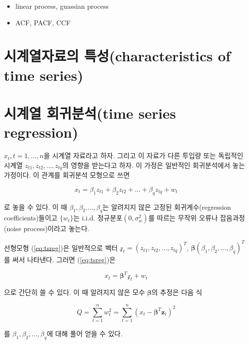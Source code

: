 \documentclass[b5paper,]{scrbook}
\theoremstyle{plain}
\theoremstyle{definition}
\numberwithin{equation}{section}
\begin{document}
\begin{itemize}
\item
  linear process, guassian process
\item
  ACF, PACF, CCF
\end{itemize}

\section{시계열자료의 특성(characteristics of time
series)}\label{-characteristics-of-time-series}

\section{시계열 회귀분석(time series
regression)}\label{-time-series-regression}

\(x_{t},t=1,\ldots ,n\)을 시계열 자료라고 하자. 그리고 이 자료가 다른
투입량 또는 독립적인 시계열 \(z_{t1}, z_{t2}, \ldots ,z_{tq}\)의 영향을
받는다고 하자. 이 가정은 일반적인 회귀분석에서 놓는 가정이다. 이 관계를
회귀분석 모형으로 쓰면

\begin{equation}\label{eq:tsreg}
x_{t}=\beta_{1}z_{t1}+\beta_{2}z_{t2}+\ldots + \beta_{q}z_{tq}+w_{t}
\end{equation}

로 놓을 수 있다. 이 때 \(\beta_{1},\beta_{2}.\ldots , \beta_{q}\)는
알려지지 않은 고정된 회귀계수(regression coefficients)들이고
\(\{ w_{t}\}\)는 i.i.d. 정규분포\((0,\sigma_{w}^{2})\)를 따르는 무작위
오류나 잡음과정(noise process)이라고 놓는다.

선형모형 (\eqref{eq:tsreg})은 일반적으로 벡터
\(\mathcal{z}_{t}=(z_{t1},z_{t2},\ldots , z_{tq})^{T}\),
\(\boldsymbol{\beta}(\beta_{1},\beta_{2},\ldots ,\beta_{q})^{T}\)를 써서
나타낸다. 그러면 (\eqref{eq:tsreg})은

\begin{equation}\label{eq:tsregvec}
x_{t}=\boldsymbol{\beta}^{T}\mathcal{z}_{t}+w_{t}
\end{equation}

으로 간단히 쓸 수 있다. 이 때 알려지지 않은 모수
\(\boldsymbol{\beta}\)의 추정은 다음 식

\begin{equation}\label{eq:tsss}
Q=\sum_{t=1}^{n}w_{t}^{2}=\sum_{t=1}^{n}(x_{t}-\boldsymbol{\beta}^{T}\mathbf{z}_{t})^{2}
\end{equation}

를 \(\beta_{1},\beta_{2},\ldots ,\beta_{q}\)에 대해 풀어 얻을 수 있다.
\end{document}
